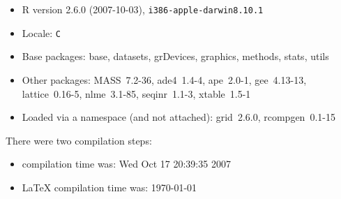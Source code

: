\documentclass{article}
\begin{document}
\begin{itemize}
  \item R version 2.6.0 (2007-10-03), \verb|i386-apple-darwin8.10.1|
  \item Locale: \verb|C|
  \item Base packages: base, datasets, grDevices, graphics, methods,
    stats, utils
  \item Other packages: MASS~7.2-36, ade4~1.4-4, ape~2.0-1,
    gee~4.13-13, lattice~0.16-5, nlme~3.1-85, seqinr~1.1-3,
    xtable~1.5-1
  \item Loaded via a namespace (and not attached): grid~2.6.0,
    rcompgen~0.1-15
\end{itemize}
There were two compilation steps:

\begin{itemize}
  \item \Rlogo{} compilation time was: Wed Oct 17 20:39:35 2007
  \item \LaTeX{} compilation time was: \today
\end{itemize}


\clearpage
{}


\end{document}

